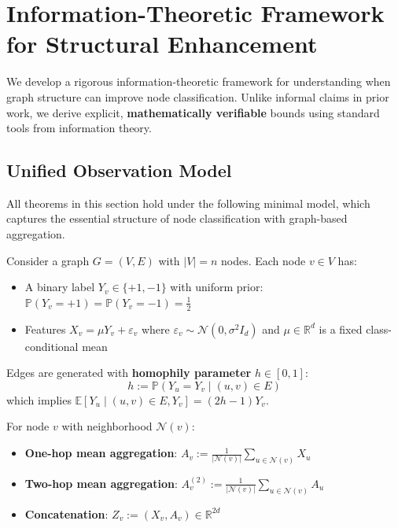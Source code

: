 
\section{Information-Theoretic Framework for Structural Enhancement}
\label{sec:budget}

We develop a rigorous information-theoretic framework for understanding when graph structure can improve node classification. Unlike informal claims in prior work, we derive explicit, \textbf{mathematically verifiable} bounds using standard tools from information theory.

\subsection{Unified Observation Model}
\label{subsec:model}

All theorems in this section hold under the following minimal model, which captures the essential structure of node classification with graph-based aggregation.

\begin{definition}
\label{def:csbm_gaussian}
Consider a graph $G = (V, E)$ with $|V| = n$ nodes. Each node $v \in V$ has:
\begin{itemize}
    \item A binary label $Y_v \in \{+1, -1\}$ with uniform prior: $\mathbb{P}(Y_v = +1) = \mathbb{P}(Y_v = -1) = \frac{1}{2}$
    \item Features $X_v = \mu Y_v + \varepsilon_v$ where $\varepsilon_v \sim \mathcal{N}(0, \sigma^2 I_d)$ and $\mu \in \mathbb{R}^d$ is a fixed class-conditional mean
\end{itemize}
Edges are generated with \textbf{homophily parameter} $h \in [0, 1]$:
\begin{equation}
    h := \mathbb{P}(Y_u = Y_v \mid (u, v) \in E)
\end{equation}
which implies $\mathbb{E}[Y_u \mid (u,v) \in E, Y_v] = (2h - 1) Y_v$.
\end{definition}

\begin{definition}
\label{def:aggregation}
For node $v$ with neighborhood $\mathcal{N}(v)$:
\begin{itemize}
    \item \textbf{One-hop mean aggregation}: $A_v := \frac{1}{|\mathcal{N}(v)|} \sum_{u \in \mathcal{N}(v)} X_u$
    \item \textbf{Two-hop mean aggregation}: $A_v^{(2)} := \frac{1}{|\mathcal{N}(v)|} \sum_{u \in \mathcal{N}(v)} A_u$
    \item \textbf{Concatenation}: $Z_v := (X_v, A_v) \in \mathbb{R}^{2d}$
\end{itemize}
\end{definition}

